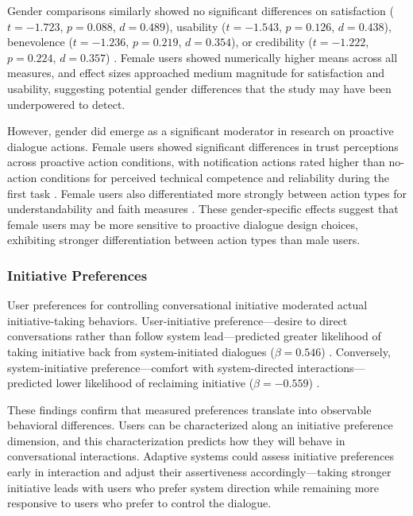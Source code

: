 \documentclass[manuscript,anonymous,sigconf]{acmart}
\begin{document}
Gender comparisons similarly showed no significant differences on satisfaction ($t = -1.723$, $p = 0.088$, $d = 0.489$), usability ($t = -1.543$, $p = 0.126$, $d = 0.438$), benevolence ($t = -1.236$, $p = 0.219$, $d = 0.354$), or credibility ($t = -1.222$, $p = 0.224$, $d = 0.357$) \cite{A54}. Female users showed numerically higher means across all measures, and effect sizes approached medium magnitude for satisfaction and usability, suggesting potential gender differences that the study may have been underpowered to detect.

However, gender did emerge as a significant moderator in research on proactive dialogue actions. Female users showed significant differences in trust perceptions across proactive action conditions, with notification actions rated higher than no-action conditions for perceived technical competence and reliability during the first task \cite{A16}. Female users also differentiated more strongly between action types for understandability and faith measures \cite{A16}. These gender-specific effects suggest that female users may be more sensitive to proactive dialogue design choices, exhibiting stronger differentiation between action types than male users.

\subsubsection{Initiative Preferences}

User preferences for controlling conversational initiative moderated actual initiative-taking behaviors. User-initiative preference---desire to direct conversations rather than follow system lead---predicted greater likelihood of taking initiative back from system-initiated dialogues ($\beta = 0.546$) \cite{A42}. Conversely, system-initiative preference---comfort with system-directed interactions---predicted lower likelihood of reclaiming initiative ($\beta = -0.559$) \cite{A42}.

These findings confirm that measured preferences translate into observable behavioral differences. Users can be characterized along an initiative preference dimension, and this characterization predicts how they will behave in conversational interactions. Adaptive systems could assess initiative preferences early in interaction and adjust their assertiveness accordingly---taking stronger initiative leads with users who prefer system direction while remaining more responsive to users who prefer to control the dialogue.
\end{document}
